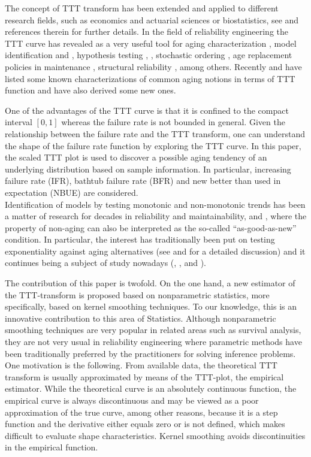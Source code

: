 \documentclass[preprint,12pt]{elsarticle}
\begin{document}
The concept of TTT transform  has been extended and applied to different research fields, such as economics and actuarial sciences or biostatistics, see \cite{NS2013} and references therein for further details. In the field of reliability engineering the TTT curve has revealed as a very useful tool for aging characterization \cite{NS2013}, model identification \cite{Klefsjo82} and \cite{RH04},  hypothesis testing \cite{Klefsjo83a}, \cite{A1987},  stochastic ordering \cite{NSB2013}, age replacement policies in maintenance \cite{ZHMS2018}, structural reliability \cite{LS2019} , among others.  Recently \cite{NS2013} and \cite{FPS2014} have listed some known characterizations of common aging notions in terms of TTT function and have also derived some new ones. 

One of the advantages of the TTT curve is that it is confined to the compact interval $[0,1]$ whereas the failure rate is not bounded in general. Given the relationship between the failure rate and the TTT transform, one can understand the shape of the failure rate function by exploring the TTT curve. 
In this paper, the scaled TTT plot is used to discover a possible aging tendency of an underlying distribution based on sample information. In particular, increasing failure rate (IFR), bathtub failure rate (BFR) and new better than used in expectation (NBUE) are considered. \\
 
Identification of models by testing monotonic and non-monotonic trends has been a matter of research for decades in reliability and maintainability, \cite{KL98} and \cite{VV09}, where the property of non-aging can also be interpreted as the so-called ``as-good-as-new'' condition. In particular, the interest has traditionally been put on testing exponentiality against aging alternatives (see \cite{LX06} and \cite{Anis2013} for a detailed discussion) and it continues being a subject of study nowadays (\cite{SSA2018}, \cite{IM2019}, and \cite{CMO2019}). 

The contribution of this paper is twofold. On the one hand, a new estimator of the TTT-transform is proposed based on nonparametric statistics, more specifically, based on kernel smoothing techniques. To our knowledge, this is an innovative contribution to this area of Statistics. Although nonparametric smoothing techniques are very popular in related areas such as survival analysis, they are not very usual in reliability engineering where parametric methods have been traditionally preferred by the practitioners for solving inference problems. 
One motivation is the following. From available data, the theoretical TTT transform is usually approximated by means of the TTT-plot, the empirical estimator. While the theoretical curve is an absolutely continuous function, the empirical curve is always discontinuous and may be viewed as a poor approximation of the true curve, among other reasons, because it is a step function and the derivative either equals zero or is not defined, which makes difficult to evaluate shape characteristics. Kernel smoothing avoids discontinuities in the empirical function.
\end{document}
